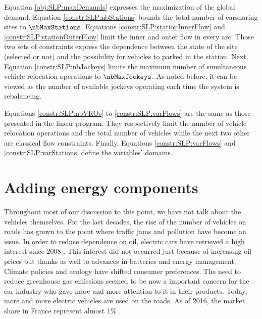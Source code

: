 \begin{bibunit}[ieeetr]
\bigskip
Equation \eqref{obj:SLP:maxDemands} expresses the maximization of the global demand.
Equation \eqref{constr:SLP:nbStations} bounds the total number of carsharing sites to $\nbMaxStations$.
Equations \eqref{constr:SLP:stationInnerFlow} and \eqref{constr:SLP:stationOuterFlow} limit the inner and outer flow in every arc.
Those two sets of constraints express the dependence between the state of the site (selected or not) and the possibility for vehicles to parked in the station.
Next, Equation \eqref{constr:SLP:nbJockeys} limits the maximum number of simultaneous vehicle relocation operations to $\nbMaxJockeys$.
As noted before, it can be viewed as the number of available jockeys operating each time the system is rebalancing.

\medskip
Equations \eqref{constr:SLP:nbVROs} to \eqref{constr:SLP:varFlows} are the same as those presented in the {\SDP} linear program.
They respectively limit the number of vehicle relocation operations and the total number of vehicles while the next two other are classical flow constraints.
Finally, Equations \eqref{constr:SLP:varFlows} and \eqref{constr:SLP:varStations} define the variables' domains.


\newpage
\section{Adding energy components}
Throughout most of our discussion to this point, we have not talk about the vehicles themselves.
For the last decades, the rise of the number of vehicles on roads has grown to the point where traffic jams and pollution have become an issue.
In order to reduce dependence on oil, electric cars have retrieved a high interest since 2008 \cite{sperling_two_2009}.
This interest did not occurred just because of increasing oil prices but thanks as well to advances in batteries and energy management.
Climate policies and ecology have shifted consumer preferences.
The need to reduce greenhouse gas emissions seemed to be now a important concern for the car industry who  gave more and more attention to it in their products.
Today, more and more electric vehicles are used on the roads.
As of 2016, the market share in France represent almost 1\% \cite{VE_MarketShare2016}.


\end{bibunit}
